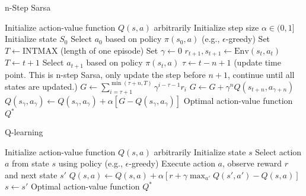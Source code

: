 \documentclass{article}
\begin{document}
\begin{algorithm}
\caption{n-Step Sarsa}
\label{alg:n-step-sarsa}
\begin{algorithmic}[1]
\Require Initialize action-value function $Q(s, a)$ arbitrarily
\State Initialize step size $\alpha \in (0, 1]$
    \State Initialize state $S_0$
    \State Select $a_0$ based on policy $\pi(s_0, a)$ (e.g., $\epsilon$-greedy)
    \State Set $T \leftarrow \text{INTMAX}$ (length of one episode)
    \State Set $\gamma \leftarrow 0$
            \State $r_{t+1}, s_{t+1} \leftarrow \text{Env}(s_t, a_t)$
                \State $T \leftarrow t + 1$
            \Else
                \State Select $a_{t+1}$ based on policy $\pi(s_t, a)$
            \EndIf
        \EndIf
        \State $\tau \leftarrow t - n + 1$ (update time point. This is n-step Sarsa, only update the step before $n+1$, continue until all states are updated.)
            \State $G \leftarrow \sum_{i=\tau+1}^{\min(\tau+n, T)} \gamma^{i-\tau-1} r_i$
                \State $G \leftarrow G + \gamma^n Q(s_{t+n}, a_{\gamma+n})$
            \EndIf
            \State $Q(s_\gamma, a_\gamma) \leftarrow Q(s_\gamma, a_\gamma) + \alpha [G - Q(s_\gamma, a_\gamma)]$
        \EndIf
    \EndFor
\EndFor
\State \Return Optimal action-value function $Q^*$
\end{algorithmic}
\end{algorithm}

\begin{algorithm}
\caption{Q-learning}
\begin{algorithmic}[1]
\Require Initialize action-value function $Q(s, a)$ arbitrarily
\Repeat
    \State Initialize state $s$
    \Repeat
        \State Select action $a$ from state $s$ using policy (e.g., $\epsilon$-greedy)
        \State Execute action $a$, observe reward $r$ and next state $s'$
        \State $Q(s, a) \gets Q(s, a) + \alpha \left[r + \gamma \max_{a'} Q(s', a') - Q(s, a)\right]$
        \State $s \gets s'$
\State \Return Optimal action-value function $Q^*$
\end{algorithmic}
\end{algorithm}
\end{document}
